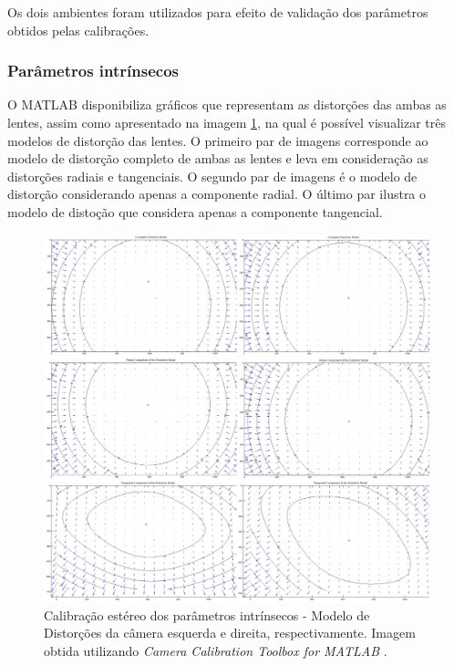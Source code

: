 Os dois ambientes foram utilizados para efeito de validação dos parâmetros obtidos pelas calibrações.

\subsubsection{Parâmetros intrínsecos}

O MATLAB disponibiliza gráficos que representam as distorções das ambas as lentes, assim como apresentado na imagem \ref{lenses_distortion}, na qual é possível visualizar três modelos de distorção das lentes. O primeiro par de imagens corresponde ao modelo de distorção completo de ambas as lentes e leva em consideração as distorções radiais e tangenciais. O segundo par de imagens é o modelo de distorção considerando apenas a componente radial. O último par ilustra o modelo de distoção que considera apenas a componente tangencial.

\begin{figure}[H]
 	\centering
 	\includegraphics[scale=0.20]{./Resources/distortion/lenses_distortion.jpg}
 	\caption{Calibração estéreo dos parâmetros intrínsecos - Modelo de Distorções da câmera esquerda e direita, respectivamente. Imagem obtida utilizando \textit{Camera Calibration Toolbox for MATLAB} \cite{Bouguet1999}.}
 	\label{lenses_distortion}
\end{figure}


